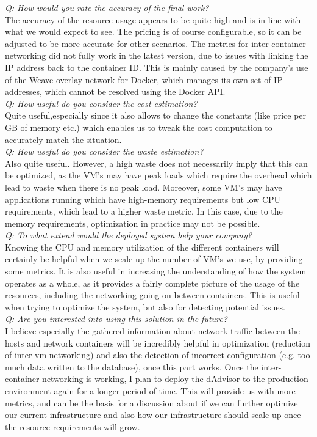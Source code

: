 \noindent
\textit{Q: How would you rate the accuracy of the final work?}\\
The accuracy of the resource usage appears to be quite high and is in line with what we would expect to see.
The pricing is of course configurable, so it can be adjusted to be more accurate for other scenarios.
The metrics for inter-container networking did not fully work in the latest version, due to issues with linking the IP address back to the container ID. This is mainly caused by the company's use of the Weave overlay network for Docker, which manages its own set of IP addresses, which cannot be resolved using the Docker API.\\

\noindent
\textit{Q: How useful do you consider the cost estimation?}\\
Quite useful,especially since it also allows to change the constants (like price per GB of memory etc.) which enables us to tweak the cost computation to accurately match the situation.\\

\noindent
\textit{Q: How useful do you consider the waste estimation?}\\
Also quite useful. However, a high waste does not necessarily imply that this can be optimized, as the VM's may have peak loads which require the overhead which lead to waste when there is no peak load.
Moreover, some VM's may have applications running which have high-memory requirements but low CPU requirements, which lead to a higher waste metric. In this case, due to the memory requirements, optimization in practice may not be possible.\\

\noindent
\textit{Q: To what extend would the deployed system help your company?}\\
Knowing the CPU and memory utilization of the different containers will certainly be helpful when we scale up the number of VM's we use, by providing some metrics.
It is also useful in increasing the understanding of how the system operates as a whole, as it provides a fairly complete picture of the usage of the resources, including the networking going on between containers. This is useful when trying to optimize the system, but also for detecting potential issues.\\

\noindent
\textit{Q: Are you interested into using this solution in the future?}\\	
I believe especially the gathered information about network traffic between the hosts and network containers will be incredibly helpful in optimization (reduction of inter-vm networking) and also the detection of incorrect configuration (e.g. too much data written to the database), once this part works.
Once the inter-container networking is working, I plan to deploy the dAdvisor to the production environment again for a longer period of time. This will provide us with more metrics, and can be the basis for a discussion about if we can further optimize our current infrastructure and also how our infrastructure should scale up once the resource requirements will grow.\\